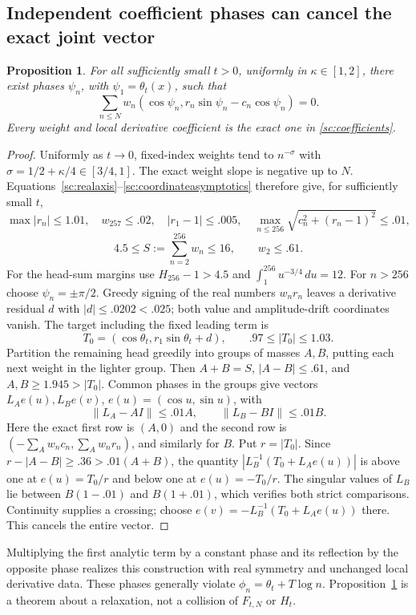 \documentclass[11pt]{article}
\numberwithin{equation}{section}
\newtheorem{proposition}[theorem]{Proposition}
\theoremstyle{definition}
\theoremstyle{remark}
\newcommand{\dd}{\,d}
\begin{document}
\subsection{Independent coefficient phases can cancel the exact joint vector}
\begin{proposition}\label{sc:independent}
For all sufficiently small $t>0$, uniformly in $\kappa\in[1,2]$, there
exist phases $\psi_n$, with $\psi_1=\theta_t(x)$, such that
\begin{equation}\label{sc:independentzero}
 \sum_{n\le N}w_n(\cos\psi_n,r_n\sin\psi_n-c_n\cos\psi_n)=0.
\end{equation}
Every weight and local derivative coefficient is the exact one in
\eqref{sc:coefficients}.
\end{proposition}
\begin{proof}
Uniformly as $t\to0$, fixed-index weights tend to $n^{-\sigma}$ with
$\sigma=1/2+\kappa/4\in[3/4,1]$. The exact weight slope is negative up
to $N$. Equations~\eqref{sc:realaxis}--\eqref{sc:coordinateasymptotics}
therefore give, for sufficiently small $t$,
\[
 \max|r_n|\le1.01,\quad w_{257}\le.02,\quad |r_1-1|\le.005,
 \quad\max_{n\le256}\sqrt{c_n^2+(r_n-1)^2}\le.01,
\]
\[
 4.5\le S:=\sum_{n=2}^{256}w_n\le16,\qquad w_2\le.61.
\]
For the head-sum margins use $H_{256}-1>4.5$ and
$\int_1^{256}u^{-3/4}\dd u=12$.
For $n>256$ choose $\psi_n=\pm\pi/2$. Greedy signing of the real
numbers $w_nr_n$ leaves a derivative residual $d$ with
$|d|\le.0202<.025$; both value and amplitude-drift coordinates vanish.
The target including the fixed leading term is
\[
 T_0=(\cos\theta_t,r_1\sin\theta_t+d),\qquad .97\le|T_0|\le1.03.
\]
Partition the remaining head greedily into groups of masses $A,B$, putting
each next weight in the lighter group. Then $A+B=S$, $|A-B|\le.61$,
and $A,B\ge1.945>|T_0|$. Common phases in the groups give vectors
$L_Ae(u),L_Be(v)$, $e(u)=(\cos u,\sin u)$, with
\[
 \|L_A-AI\|\le.01A,\qquad \|L_B-BI\|\le.01B.
\]
Here the exact first row is $(A,0)$ and the second row is
$(-\sum_Aw_nc_n,\sum_Aw_nr_n)$, and similarly for $B$.
Put $r=|T_0|$. Since $r-|A-B|\ge.36>.01(A+B)$, the quantity
$|L_B^{-1}(T_0+L_Ae(u))|$ is above one at $e(u)=T_0/r$ and below
one at $e(u)=-T_0/r$. The singular values of $L_B$ lie between
$B(1-.01)$ and $B(1+.01)$, which verifies both strict comparisons.
Continuity supplies a crossing; choose
$e(v)=-L_B^{-1}(T_0+L_Ae(u))$ there. This cancels the entire vector.
\end{proof}
Multiplying the first analytic term by a constant phase and its reflection
by the opposite phase realizes this construction with real symmetry and
unchanged local derivative data. These phases generally violate
$\phi_n=\theta_t+T\log n$. Proposition~\ref{sc:independent} is a
theorem about a relaxation, not a collision of $F_{t,N}$ or $H_t$.
\end{document}
